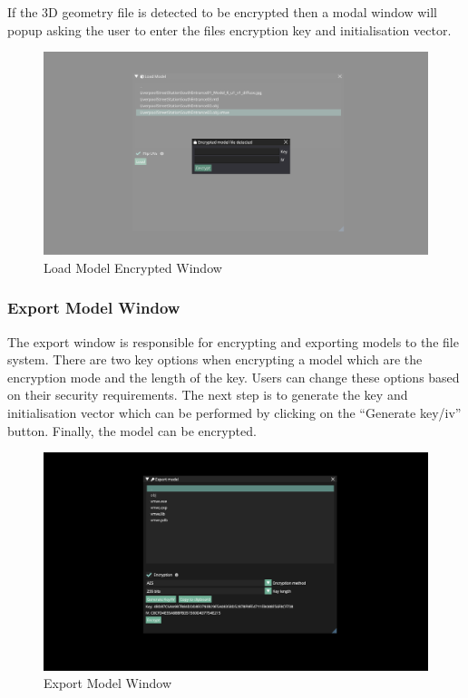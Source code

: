 \documentclass[11pt]{article}
\begin{document}
If the 3D geometry file is detected to be encrypted then a modal window will
popup asking the user to enter the files encryption key and initialisation
vector. 
\begin{figure}[H]
  \centering
  \includegraphics[width=\textwidth]{images/load_model_encrypted_window.png}
  \caption{Load Model Encrypted Window}
  \label{fig:load_model_encrypted_window}
\end{figure}

\subsubsection{Export Model Window}
The export window is responsible for encrypting and exporting models to the file
system. There are two key options when encrypting a model which are the
encryption mode and the length of the key. Users can change these options based
on their security requirements. The next step is to generate the key and
initialisation vector which can be performed by clicking on the ``Generate
key/iv'' button. Finally, the model can be encrypted.
\begin{figure}[H]
  \centering
  \includegraphics[width=\textwidth]{images/encryption_system.png}
  \caption{Export Model Window}
  \label{fig:encryption_window}
\end{figure}
\end{document}
